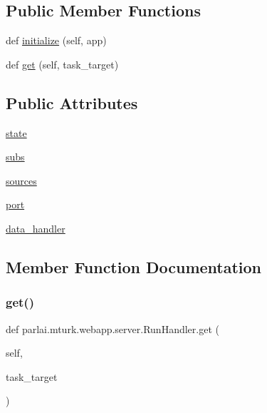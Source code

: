 \subsection*{Public Member Functions}
\begin{DoxyCompactItemize}
\item 
def \hyperlink{classparlai_1_1mturk_1_1webapp_1_1server_1_1RunHandler_abec3206f51ca4edd33ce201ef4131581}{initialize} (self, app)
\item 
def \hyperlink{classparlai_1_1mturk_1_1webapp_1_1server_1_1RunHandler_acf94dbda8676931e2ac205e2c8420b39}{get} (self, task\+\_\+target)
\end{DoxyCompactItemize}
\subsection*{Public Attributes}
\begin{DoxyCompactItemize}
\item 
\hyperlink{classparlai_1_1mturk_1_1webapp_1_1server_1_1RunHandler_a8c691d0a32bac2c64f4cdf8861cfa3fa}{state}
\item 
\hyperlink{classparlai_1_1mturk_1_1webapp_1_1server_1_1RunHandler_a3888f3782c09030eb6eed0bb3734b4c6}{subs}
\item 
\hyperlink{classparlai_1_1mturk_1_1webapp_1_1server_1_1RunHandler_af824a31f541d4421205f883d32ea87fe}{sources}
\item 
\hyperlink{classparlai_1_1mturk_1_1webapp_1_1server_1_1RunHandler_a18313aaf7e807891e1d21b0930639ca9}{port}
\item 
\hyperlink{classparlai_1_1mturk_1_1webapp_1_1server_1_1RunHandler_a55ebe293c2c36001b28f879a256fb03d}{data\+\_\+handler}
\end{DoxyCompactItemize}


\subsection{Member Function Documentation}
\mbox{\label{classparlai_1_1mturk_1_1webapp_1_1server_1_1RunHandler_acf94dbda8676931e2ac205e2c8420b39}} 
\subsubsection{\texorpdfstring{get()}{get()}}
{\footnotesize\ttfamily def parlai.\+mturk.\+webapp.\+server.\+Run\+Handler.\+get (\begin{DoxyParamCaption}\item[{}]{self,  }\item[{}]{task\+\_\+target }\end{DoxyParamCaption})}

